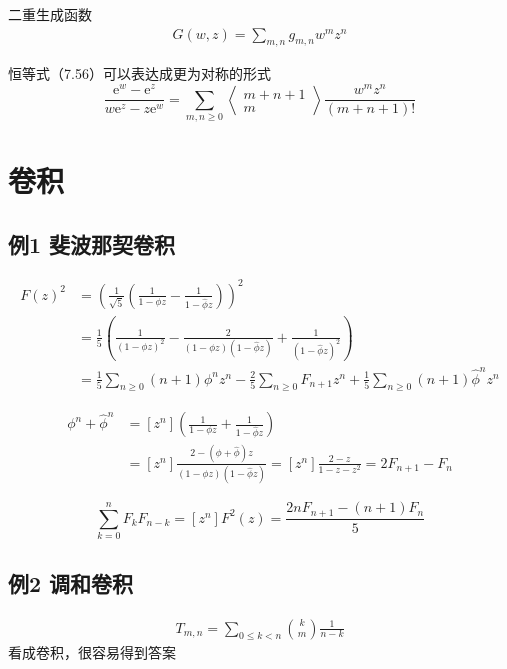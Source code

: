 二重生成函数
\begin{align*}
    G(w, z)=\sum_{m, n} g_{m, n} w^{m} z^{n}
\end{align*}

恒等式（7.56）可以表达成更为对称的形式
\begin{equation}
    \frac{\mathrm{e}^{w}-\mathrm{e}^{z}}{w \mathrm{e}^{z}-z \mathrm{e}^{w}}=\sum_{m, n \geqslant 0}\left\langle\begin{array}{c}
    m+n+1 \\
    m
    \end{array}\right\rangle \frac{w^{m} z^{n}}{(m+n+1) !}
\end{equation}

\section{卷积}
\subsection{例1 斐波那契卷积}
\begin{align*}
    F(z)^{2} &=\left(\frac{1}{\sqrt{5}}\left(\frac{1}{1-\phi z}-\frac{1}{1-\hat{\phi} z}\right)\right)^{2} \\
    &=\frac{1}{5}\left(\frac{1}{(1-\phi z)^{2}}-\frac{2}{(1-\phi z)(1-\hat{\phi} z)}+\frac{1}{(1-\hat{\phi} z)^{2}}\right) \\
    &=\frac{1}{5} \sum_{n \geqslant 0}(n+1) \phi^{n} z^{n}-\frac{2}{5} \sum_{n \geqslant 0} F_{n+1} z^{n}+\frac{1}{5} \sum_{n \geqslant 0}(n+1) \hat{\phi}^{n} z^{n}
\end{align*}

\begin{align*}
    \phi^{n}+\hat{\phi}^{n} &=\left[z^{n}\right]\left(\frac{1}{1-\phi z}+\frac{1}{1-\hat{\phi} z}\right) \\
    &=\left[z^{n}\right] \frac{2-(\phi+\hat{\phi}) z}{(1-\phi z)(1-\hat{\phi} z)}=\left[z^{n}\right] \frac{2-z}{1-z-z^{2}}=2 F_{n+1}-F_{n}
\end{align*}

\begin{equation}
    \sum_{k=0}^{n} F_{k} F_{n-k}= [z^n] F^2(z) = \frac{2 n F_{n+1}-(n+1) F_{n}}{5}
\end{equation}

\subsection{例2 调和卷积}
\begin{align*}
    T_{m, n}=\sum_{0 \leqslant k<n}{k  \choose m} \frac{1}{n-k}
\end{align*}
看成卷积，很容易得到答案

